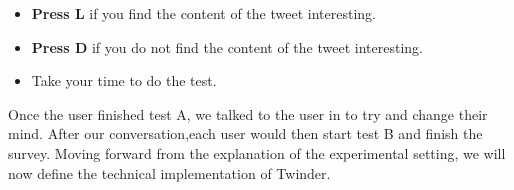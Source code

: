 \begin{itemize}
  \item \textbf{Press L} if you find the content of the tweet interesting.
  \item \textbf{Press D} if you do not find the content of the tweet interesting.
  \item Take your time to do the test.
\end{itemize}

 


Once the user finished test A, we talked to the user in to try and change their mind. After our conversation,each user would then start test B and finish the survey.
Moving forward from the explanation of the experimental setting, we will now define the technical implementation of Twinder.
